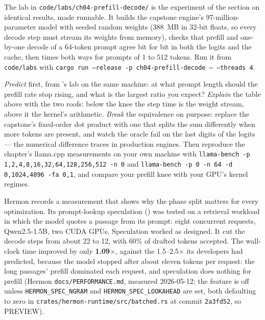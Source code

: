 
The lab in \texttt{code/labs/ch04-prefill-decode/} is the experiment of the
section on identical results, made runnable. It builds the capstone engine's
97-million-parameter model with seeded random weights (388~MB in 32-bit floats,
so every decode step must stream its weights from memory), checks that prefill
and one-by-one decode of a 64-token prompt agree bit for bit in both the logits
and the cache, then times both ways for prompts of 1 to 512 tokens. Run it from
\texttt{code/labs} with \texttt{cargo run --release -p ch04-prefill-decode --
--threads 4}.

\emph{Predict} first, from 's lab on the same machine: at what
prompt length should the prefill rate stop rising, and what is the largest
ratio you expect? \emph{Explain} the table above with the two roofs: below the
knee the step time is the weight stream, above it the kernel's arithmetic.
\emph{Break} the equivalence on purpose: replace the capstone's fixed-order dot
product with one that splits the sum differently when more tokens are present,
and watch the oracle fail on the last digits of the logits --- the numerical
difference  traces in production engines. Then
reproduce the chapter's llama.cpp measurements on your own machine with
\texttt{llama-bench -p 1,2,4,8,16,32,64,128,256,512 -n 0} and
\texttt{llama-bench -p 0 -n 64 -d 0,1024,4096 -fa 0,1}, and compare your
prefill knee with your GPU's kernel regimes.


Hermon records a measurement that shows why the phase split matters for every
optimization. Its prompt-lookup speculation () was
tested on a retrieval workload in which the model quotes a passage from its
prompt: eight concurrent requests, Qwen2.5-1.5B, two CUDA GPUs. Speculation
worked as designed. It cut the decode steps from about 22 to 12, with 60\% of
drafted tokens accepted. The wall-clock time improved by only
\textbf{1.09$\times$}, against the 1.5--2.5$\times$ its developers had
predicted, because the model stopped after about eleven tokens per request:
the long passages' prefill dominated each request, and speculation does
nothing for prefill (Hermon \texttt{docs/PERFORMANCE.md}, measured 2026-05-12;
the feature is off unless \texttt{HERMON\_SPEC\_NGRAM} and
\texttt{HERMON\_SPEC\_LOOKAHEAD} are set, both defaulting to zero in
\texttt{crates/hermon-runtime/src/batched.rs} at commit \texttt{2a3fd52}, so
PREVIEW).


